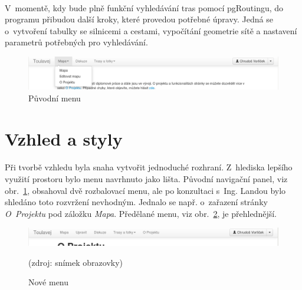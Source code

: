 \documentclass[11pt,a4paper,titlepage,oneside]{book}
\begin{document}
			\paragraph{} V~momentě, kdy bude plně funkční vyhledávání tras pomocí pgRoutingu, do programu přibudou další kroky, které provedou potřebné úpravy. Jedná se o~vytvoření tabulky se silnicemi a cestami, vypočítání geometrie sítě a nastavení parametrů potřebných pro vyhledávání.

		\begin{figure}[!h]
			\begin{center}
				\includegraphics[width=12cm]{obrazky/toulavej/menu_puv.png}
				\caption{Původní menu}
				\label{fig:menu_puv}
			\end{center}
		\end{figure}	

		\section{Vzhled a styly}


			\paragraph{} Při tvorbě vzhledu byla snaha vytvořit jednoduché rozhraní. Z~hlediska lepšího využití prostoru bylo menu navrhnuto jako lišta. Původní navigační panel, viz obr.~\ref{fig:menu_puv}, obsahoval dvě rozbalovací menu, ale po konzultaci s~Ing. Landou bylo shledáno toto rozvržení nevhodným. Jednalo se např. o~zařazení stránky \textit{O~Projektu} pod záložku \textit{Mapa}. Předělané menu, viz obr.~\ref{fig:menu_nove}, je přehlednější.
		\begin{figure}[!h]
			\begin{center}
				\includegraphics[width=12cm]{obrazky/toulavej/menu_nove.png}
				\caption{Nové menu}
				\label{fig:menu_nove}
				(zdroj: snímek obrazovky)
			\end{center}
		\end{figure}	
\end{document}
